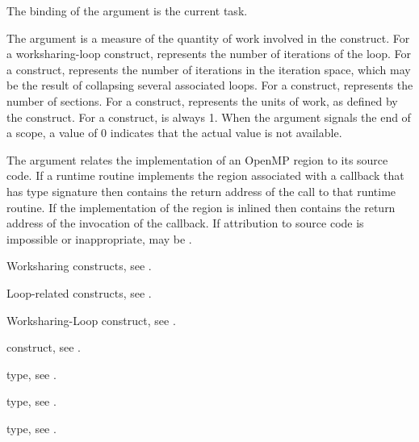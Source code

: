 The binding of the  argument is the current task.

The  argument is a measure of the quantity of work involved in 
the construct. For a worksharing-loop construct,  represents the 
number of iterations of the loop. For a  construct,  
represents the number of iterations in the iteration space, which may be the 
result of collapsing several associated loops. For a  construct, 
 represents the number of sections. For a  construct,
 represents the units of work, as defined by the  
construct. For a  construct,  is always 1. When the 
 argument signals the end of a scope, a  value of 0 
indicates that the actual  value is not available.

The  argument relates the implementation of an OpenMP region
to its source code. If a runtime routine implements the region associated with
a callback that has type signature  then
 contains the return address of the call to that runtime routine.
If the implementation of the region is inlined then  contains the
return address of the invocation of the callback. If attribution to source code
is impossible or inappropriate,  may be .

\begin{crossrefs}
\item Worksharing constructs, see .

\item Loop-related constructs, see .

\item Worksharing-Loop construct, see .

\item {} construct, see .

\item {} type, see
.

\item {} type, see
.

\item {} type, see
.
\end{crossrefs}



